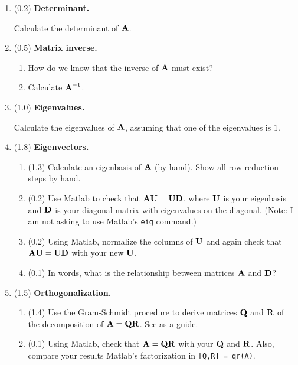 \documentclass[11pt,titlepage,fleqn]{article}
\begin{document}
\begin{enumerate}
\item (0.2) {\bf Determinant.}

Calculate the determinant of $\mbox{${\bf A}$}$.

\item (0.5) {\bf Matrix inverse.}

\begin{enumerate}
\item How do we know that the inverse of $\mbox{${\bf A}$}$ must exist?
\item Calculate $\mbox{${\bf A}$}^{-1}$.
\end{enumerate}

\item (1.0) {\bf Eigenvalues.}

Calculate the eigenvalues of $\mbox{${\bf A}$}$, assuming that one of the eigenvalues is $1$.

\item (1.8) {\bf Eigenvectors.}

\begin{enumerate}
\item (1.3) Calculate an eigenbasis of $\mbox{${\bf A}$}$ (by hand). Show all row-reduction steps by hand.

\item (0.2) Use Matlab to check that $\mbox{${\bf A}$}\mbox{${\bf U}$} = \mbox{${\bf U}$}\mbox{${\bf D}$}$, where $\mbox{${\bf U}$}$ is your eigenbasis and $\mbox{${\bf D}$}$ is your diagonal matrix with eigenvalues on the diagonal. (Note: I am not asking to use Matlab's \verb+eig+ command.)

\item (0.2) Using Matlab, normalize the columns of $\mbox{${\bf U}$}$ and again check that $\mbox{${\bf A}$}\mbox{${\bf U}$} = \mbox{${\bf U}$}\mbox{${\bf D}$}$ with your new $\mbox{${\bf U}$}$.

\item (0.1) In words, what is the relationship between matrices $\mbox{${\bf A}$}$ and $\mbox{${\bf D}$}$?
\end{enumerate}

\pagebreak
\item (1.5) {\bf Orthogonalization.}

\begin{enumerate}
\item (1.4) Use the Gram-Schmidt procedure to derive matrices $\mbox{${\bf Q}$}$ and $\mbox{${\bf R}$}$ of the decomposition of $\mbox{${\bf A}$} = \mbox{${\bf Q}$}\mbox{${\bf R}$}$. See  as a guide.

\item (0.1) Using Matlab, check that $\mbox{${\bf A}$} = \mbox{${\bf Q}$}\mbox{${\bf R}$}$ with your $\mbox{${\bf Q}$}$ and $\mbox{${\bf R}$}$. Also, compare your results Matlab's factorization in \verb+[Q,R] = qr(A)+.
\end{enumerate}

\end{enumerate}
\end{document}
